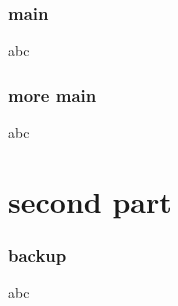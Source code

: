 \documentclass{beamer}
\begin{document}
\begin{frame}
\tableofcontents
\end{frame}

\section{main}
\begin{frame}
    abc
\end{frame} 

\section{more main}
\begin{frame}
    abc
\end{frame} 

\part{second part}
\section{backup}
\begin{frame}
    abc
\end{frame} 
\end{document}
